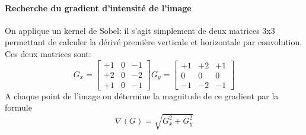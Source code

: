 \documentclass[a4paper, 12pt, titlepage, oneside, french]{article}
\begin{document}
		\paragraph{\textbf{Recherche du gradient d'intensité de l'image}}
				On applique un kernel de Sobel: il s'agit simplement de deux matrices 3x3 permettant de calculer la dérivé première verticale et horizontale par convolution. Ces deux matrices sont:
				\\ \[G_x = \begin{bmatrix}  +1  & 0 & -1 \\ +2 & 0 & -2  \\ +1 &  0 & -1\end{bmatrix} 
					G_y = \begin{bmatrix} +1 & +2 & +1  \\  0 & 0 &  0  \\ -1 & -2 & -1\end{bmatrix}\]
						A chaque point de l'image on détermine la magnitude de ce gradient par la formule
					\[\nabla(G) = \sqrt{G_x^2 + G_y^2}\]
\end{document}
